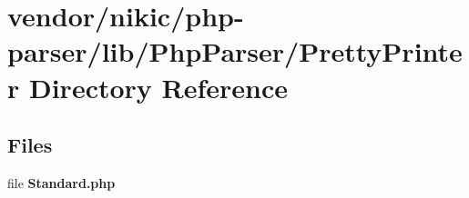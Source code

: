 \section{vendor/nikic/php-\/parser/lib/\+Php\+Parser/\+Pretty\+Printer Directory Reference}
\label{dir_e428f8df0a93c60b8be128d68aeb5fdd}
\subsection*{Files}
\begin{DoxyCompactItemize}
\item 
file {\bf Standard.\+php}
\end{DoxyCompactItemize}
